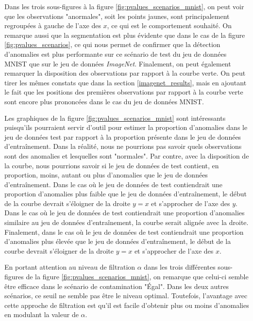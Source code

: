 Dans les trois sous-figures à la figure \ref{fig:pvalues_scenarios_mnist}, on peut voir que les observations "anormales", soit les points jaunes, sont principalement regroupées à gauche de l'axe des $x$, ce qui est le comportement souhaité. On remarque aussi que la segmentation est plus évidente que dans le cas de la figure \ref{fig:pvalues_scenarios}, ce qui nous permet de confirmer que la détection d'anomalies est plus performante sur ce scénario de test du jeu de données MNIST que sur le jeu de données \textit{ImageNet}. Finalement, on peut également remarquer la disposition des observations par rapport à la courbe verte. On peut tirer les mêmes constats que dans la section \ref{imagenet_results}, mais en ajoutant le fait que les positions des premières observations par rapport à la courbe verte sont encore plus prononcées dans le cas du jeu de données MNIST. 

Les graphiques de la figure \ref{fig:pvalues_scenarios_mnist} sont intéressants puisqu'ils pourraient servir d'outil pour estimer la proportion d'anomalies dans le jeu de données test par rapport à la proportion présente dans le jeu de données d'entraînement. Dans la réalité, nous ne pourrions pas savoir quels observations sont des anomalies et lesquelles sont "normales". Par contre, avec la disposition de la courbe, nous pourrions savoir si le jeu de données de test contient, en proportion, moins, autant ou plus d'anomalies que le jeu de données d'entraînement. Dans le cas où le jeu de données de test contiendrait une proportion d'anomalies plus faible que le jeu de données d'entraînement, le début de la courbe devrait s'éloigner de la droite $y=x$ et s'approcher de l'axe des $y$. Dans le cas où le jeu de données de test contiendrait une proportion d'anomalies similaire au jeu de données d'entraînement, la courbe serait alignée avec la droite. Finalement, dans le cas où le jeu de données de test contiendrait une proportion d'anomalies plus élevée que le jeu de données d'entraînement, le début de la courbe devrait s'éloigner de la droite $y=x$ et s'approcher de l'axe des $x$.

En portant attention au niveau de filtration $\alpha$ dans les trois différentes sous-figures de la figure \ref{fig:pvalues_scenarios_mnist}, on remarque que celui-ci semble être efficace dans le scénario de contamination "Égal". Dans les deux autres scénarios, ce seuil ne semble pas être le niveau optimal. Toutefois, l'avantage avec cette approche de filtration est qu'il est facile d'obtenir plus ou moins d'anomalies en modulant la valeur de $\alpha$.

